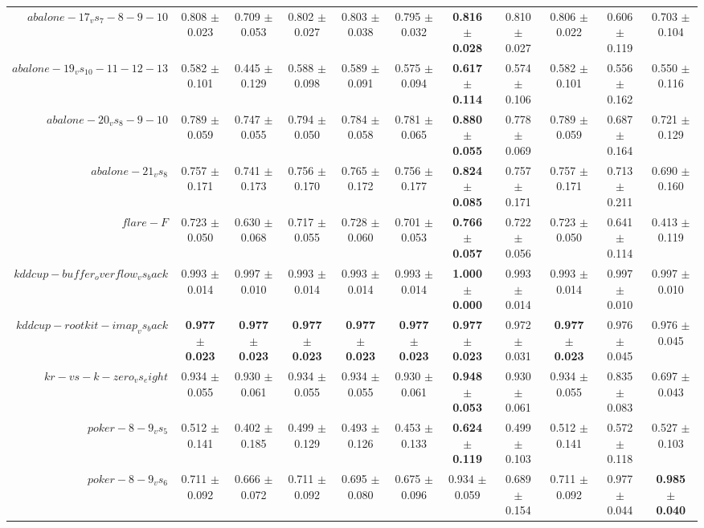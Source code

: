 \begin{table}[!ht]
{\begin{tabular}{r c c c c c c c c c c}
$abalone-17_vs_7-8-9-10$ & 0.808 $\pm$ 0.023 & 0.709 $\pm$ 0.053 & 0.802 $\pm$ 0.027 & 0.803 $\pm$ 0.038 & 0.795 $\pm$ 0.032 & \textbf{0.816 $\pm$ 0.028} & 0.810 $\pm$ 0.027 & 0.806 $\pm$ 0.022 & 0.606 $\pm$ 0.119 & 0.703 $\pm$ 0.104 \\
$abalone-19_vs_10-11-12-13$ & 0.582 $\pm$ 0.101 & 0.445 $\pm$ 0.129 & 0.588 $\pm$ 0.098 & 0.589 $\pm$ 0.091 & 0.575 $\pm$ 0.094 & \textbf{0.617 $\pm$ 0.114} & 0.574 $\pm$ 0.106 & 0.582 $\pm$ 0.101 & 0.556 $\pm$ 0.162 & 0.550 $\pm$ 0.116 \\
$abalone-20_vs_8-9-10$ & 0.789 $\pm$ 0.059 & 0.747 $\pm$ 0.055 & 0.794 $\pm$ 0.050 & 0.784 $\pm$ 0.058 & 0.781 $\pm$ 0.065 & \textbf{0.880 $\pm$ 0.055} & 0.778 $\pm$ 0.069 & 0.789 $\pm$ 0.059 & 0.687 $\pm$ 0.164 & 0.721 $\pm$ 0.129 \\
$abalone-21_vs_8$ & 0.757 $\pm$ 0.171 & 0.741 $\pm$ 0.173 & 0.756 $\pm$ 0.170 & 0.765 $\pm$ 0.172 & 0.756 $\pm$ 0.177 & \textbf{0.824 $\pm$ 0.085} & 0.757 $\pm$ 0.171 & 0.757 $\pm$ 0.171 & 0.713 $\pm$ 0.211 & 0.690 $\pm$ 0.160 \\
$flare-F$ & 0.723 $\pm$ 0.050 & 0.630 $\pm$ 0.068 & 0.717 $\pm$ 0.055 & 0.728 $\pm$ 0.060 & 0.701 $\pm$ 0.053 & \textbf{0.766 $\pm$ 0.057} & 0.722 $\pm$ 0.056 & 0.723 $\pm$ 0.050 & 0.641 $\pm$ 0.114 & 0.413 $\pm$ 0.119 \\
$kddcup-buffer_overflow_vs_back$ & 0.993 $\pm$ 0.014 & 0.997 $\pm$ 0.010 & 0.993 $\pm$ 0.014 & 0.993 $\pm$ 0.014 & 0.993 $\pm$ 0.014 & \textbf{1.000 $\pm$ 0.000} & 0.993 $\pm$ 0.014 & 0.993 $\pm$ 0.014 & 0.997 $\pm$ 0.010 & 0.997 $\pm$ 0.010 \\
$kddcup-rootkit-imap_vs_back$ & \textbf{0.977 $\pm$ 0.023} & \textbf{0.977 $\pm$ 0.023} & \textbf{0.977 $\pm$ 0.023} & \textbf{0.977 $\pm$ 0.023} & \textbf{0.977 $\pm$ 0.023} & \textbf{0.977 $\pm$ 0.023} & 0.972 $\pm$ 0.031 & \textbf{0.977 $\pm$ 0.023} & 0.976 $\pm$ 0.045 & 0.976 $\pm$ 0.045 \\
$kr-vs-k-zero_vs_eight$ & 0.934 $\pm$ 0.055 & 0.930 $\pm$ 0.061 & 0.934 $\pm$ 0.055 & 0.934 $\pm$ 0.055 & 0.930 $\pm$ 0.061 & \textbf{0.948 $\pm$ 0.053} & 0.930 $\pm$ 0.061 & 0.934 $\pm$ 0.055 & 0.835 $\pm$ 0.083 & 0.697 $\pm$ 0.043 \\
$poker-8-9_vs_5$ & 0.512 $\pm$ 0.141 & 0.402 $\pm$ 0.185 & 0.499 $\pm$ 0.129 & 0.493 $\pm$ 0.126 & 0.453 $\pm$ 0.133 & \textbf{0.624 $\pm$ 0.119} & 0.499 $\pm$ 0.103 & 0.512 $\pm$ 0.141 & 0.572 $\pm$ 0.118 & 0.527 $\pm$ 0.103 \\
$poker-8-9_vs_6$ & 0.711 $\pm$ 0.092 & 0.666 $\pm$ 0.072 & 0.711 $\pm$ 0.092 & 0.695 $\pm$ 0.080 & 0.675 $\pm$ 0.096 & 0.934 $\pm$ 0.059 & 0.689 $\pm$ 0.154 & 0.711 $\pm$ 0.092 & 0.977 $\pm$ 0.044 & \textbf{0.985 $\pm$ 0.040} \\

\end{tabular}}
\end{table}

